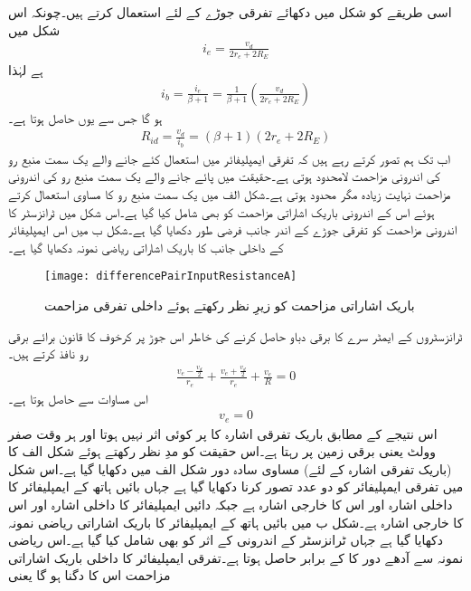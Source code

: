 اسی طریقے کو شکل   میں دکھائے تفرقی جوڑے کے لئے استعمال کرتے ہیں۔چونکہ اس شکل میں
\begin{align}
i_e=\frac{v_d}{2 r_e+2 R_E}
\end{align}
ہے لہٰذا
\begin{align}
i_b=\frac{i_e}{\beta+1}=\frac{1}{\beta+1} \left(\frac{v_d}{2 r_e +2 R_E} \right )
\end{align}
ہو گا جس سے  یوں حاصل ہوتا ہے۔
\begin{align}
R_{id}=\frac{v_d}{i_b}=\left(\beta+1 \right ) \left(2 r_e+2 R_E \right )
\end{align}
اب تک ہم تصور کرتے رہے ہیں کہ تفرقی ایمپلیفائر میں استعمال کئے جانے والے یک سمت  منبع رو کی اندرونی مزاحمت لامحدود ہوتی ہے۔حقیقت میں پائے جانے والے یک سمت  منبع رو کی اندرونی مزاحمت نہایت زیادہ مگر محدود ہوتی ہے۔شکل  الف میں یک سمت  منبع رو کا مساوی  استعمال کرتے ہوئے اس کے اندرونی باریک اشاراتی مزاحمت   کو بھی شامل کیا گیا ہے۔اس شکل میں ٹرانزسٹر کا اندرونی مزاحمت   کو تفرقی جوڑے کے اندر جانب فرضی طور دکھایا گیا ہے۔شکل  ب میں اس ایمپلیفائر کے داخلی جانب کا باریک اشاراتی ریاضی نمونہ دکھایا گیا ہے۔
\begin{figure}
\centering
\texttt{[image: differencePairInputResistanceA]}
\caption{باریک اشاراتی مزاحمت کو زیرِ نظر رکھتے ہوئے داخلی تفرقی مزاحمت}
\label{شکل_باریک_اشاراتی_مزاحمت_کو_زیر_نظر}
\end{figure}
ٹرانزسٹروں کے ایمٹر سرے کا برقی دباو  حاصل کرنے کی خاطر اس جوڑ پر کرخوف کا قانون برائے برقی رو نافذ کرتے ہیں۔
\begin{align}
\frac{v_e - \frac{v_d}{2}}{r_e} + \frac{v_e + \frac{v_d}{2}}{r_e} +\frac{v_e}{R}=0
\end{align}
اس مساوات سے حاصل ہوتا ہے۔
\begin{align}\label{مساوات_تفرقی_جوڑا_تفرقی_اشارے_کے_لئے_جوڑے_کی_مخارج_برقی_زمین_ہے}
v_e=0
\end{align}
اس نتیجے کے مطابق باریک تفرقی اشارہ   کا  پر کوئی اثر نہیں ہوتا اور    ہر وقت صفر وولٹ یعنی برقی زمین پر رہتا ہے۔اس حقیقت کو مدِ نظر رکھتے ہوئے شکل  الف  کا (باریک تفرقی اشارہ کے لئے) مساوی سادہ دور شکل  الف میں دکھایا گیا ہے۔اس شکل میں تفرقی ایمپلیفائر کو دو عدد   تصور کرنا دکھایا گیا ہے جہاں بائیں ہاتھ کے ایمپلیفائر کا داخلی اشارہ  اور اس کا خارجی اشارہ  ہے جبکہ دائیں ایمپلیفائر کا داخلی اشارہ  اور اس کا خارجی اشارہ  ہے۔شکل  ب میں بائیں ہاتھ کے ایمپلیفائر کا باریک اشاراتی ریاضی نمونہ دکھایا گیا ہے جہاں ٹرانزسٹر کے اندرونی   کے اثر کو بھی شامل کیا گیا ہے۔اس  ریاضی نمونہ سے آدھے دور کا    کے برابر حاصل ہوتا ہے۔تفرقی ایمپلیفائر کا داخلی باریک اشاراتی مزاحمت اس کا دگنا ہو گا یعنی
